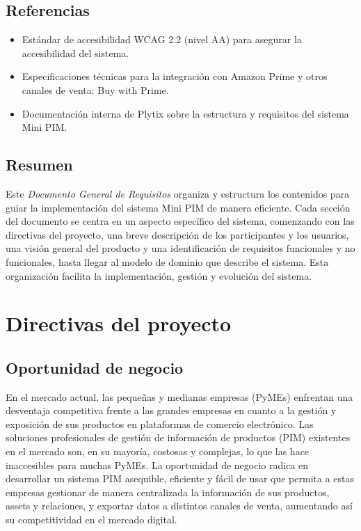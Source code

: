\documentclass{article}
\begin{document}
\subsection{Referencias}

\begin{itemize}
    \item Estándar de accesibilidad WCAG 2.2 (nivel AA) para asegurar la accesibilidad del sistema.
    \item Especificaciones técnicas para la integración con Amazon Prime y otros canales de venta: Buy with Prime.
    \item Documentación interna de Plytix sobre la estructura y requisitos del sistema Mini PIM.
\end{itemize}

\subsection{Resumen}

Este \textit{Documento General de Requisitos} organiza y estructura los contenidos para guiar la implementación del sistema Mini PIM de manera eficiente. Cada sección del documento se centra en un aspecto específico del sistema, comenzando con las directivas del proyecto, una breve descripción de los participantes y los usuarios, una visión general del producto y una identificación de requisitos funcionales y no funcionales, hasta llegar al modelo de dominio que describe el sistema. Esta organización facilita la implementación, gestión y evolución del sistema.

\section{Directivas del proyecto}

\subsection{Oportunidad de negocio}

En el mercado actual, las pequeñas y medianas empresas (PyMEs) enfrentan una desventaja competitiva frente a las grandes empresas en cuanto a la gestión y exposición de sus productos en plataformas de comercio electrónico. Las soluciones profesionales de gestión de información de productos (PIM) existentes en el mercado son, en su mayoría, costosas y complejas, lo que las hace inaccesibles para muchas PyMEs. La oportunidad de negocio radica en desarrollar un sistema PIM asequible, eficiente y fácil de usar que permita a estas empresas gestionar de manera centralizada la información de sus productos, assets y relaciones, y exportar datos a distintos canales de venta, aumentando así su competitividad en el mercado digital.
\end{document}
